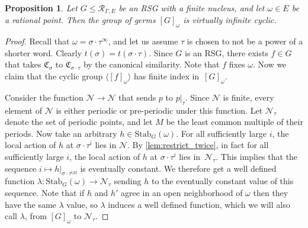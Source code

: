 \documentclass[11pt,letterpaper]{amsart}
\newtheorem{proposition}[theorem]{Proposition}
\theoremstyle{definition}
\newcommand{\R}{\mathcal{R}}
\newcommand{\Nuc}{\mathcal{N}}
\newcommand{\C}{\mathfrak{C}}
\newcommand{\Stab}{\mathrm{Stab}}
\begin{document}
\begin{proposition}\label{prop:CyclicStabilizers}
Let $G\leq \R_{\Gamma,E}$ be an RSG with a finite nucleus, and let $\omega\in E$ be a rational point.  Then the group of germs\/ $[G]_\omega$ is virtually infinite cyclic.
\end{proposition}
\begin{proof}
Recall that $\omega=\sigma\cdot\tau^\infty$, and let us assume $\tau$ is chosen to not be a power of a shorter word. Clearly $t(\sigma)=t(\sigma\cdot \tau)$.  Since $G$ is an RSG,  there exists $f\in G$ that takes $\C_\sigma$ to $\C_{\sigma\cdot\tau}$ by the canonical similarity. Note that $f$ fixes $\omega$. Now we claim that the cyclic group $\langle [f]_\omega \rangle$ has finite index in~$[G]_\omega$. 

Consider the function $\Nuc\to\Nuc$ that sends $p$ to $p|_\tau$. Since $\Nuc$ is finite, every element of $\Nuc$ is either periodic or pre-periodic under this function. Let $\Nuc_\tau$ denote the set of periodic points, and let $M$ be the least common multiple of their periods. Now take an arbitrary $h\in \Stab_G(\omega)$. For all sufficiently large $i$, the local action of $h$ at $\sigma\cdot\tau^i$ lies in $\Nuc$. By \cref{lem:restrict_twice}, in fact for all sufficiently large $i$, the local action of $h$ at $\sigma\cdot\tau^i$ lies in~$\Nuc_\tau$. This implies that the sequence $i\mapsto h|_{\sigma\cdot\tau^{iM}}$ is eventually constant. We therefore get a well defined function $\lambda\colon \Stab_G(\omega)\to \Nuc_\tau$ sending $h$ to the eventually constant value of this sequence. Note that if $h$ and $h'$ agree in an open neighborhood of $\omega$ then they have the same $\lambda$ value, so $\lambda$ induces a well defined function, which we will also call $\lambda$, from $[G]_\omega$ to $\Nuc_\tau$.


\end{proof}
\end{document}
